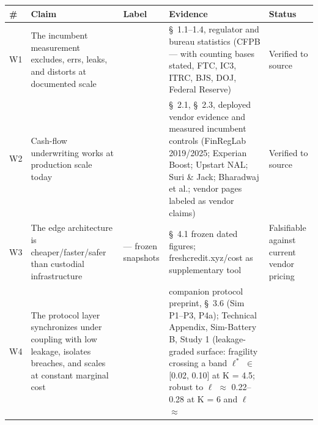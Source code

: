 \documentclass[
]{article}
\newcounter{none} %
\begin{document}
{\def\LTcaptype{none} %
\begin{longtable}[]{@{}
  >{\raggedright\arraybackslash}p{}
  >{\raggedright\arraybackslash}p{}
  >{\raggedright\arraybackslash}p{}
  >{\raggedright\arraybackslash}p{}
  >{\raggedright\arraybackslash}p{}@{}}
\toprule\noalign{}
\begin{minipage}[b]{\linewidth}\raggedright
\#
\end{minipage} & \begin{minipage}[b]{\linewidth}\raggedright
Claim
\end{minipage} & \begin{minipage}[b]{\linewidth}\raggedright
Label
\end{minipage} & \begin{minipage}[b]{\linewidth}\raggedright
Evidence
\end{minipage} & \begin{minipage}[b]{\linewidth}\raggedright
Status
\end{minipage} \\
\midrule\noalign{}
\endhead
\bottomrule\noalign{}
\endlastfoot
W1 & The incumbent measurement excludes, errs, leaks, and distorts at
documented scale & & §~1.1--1.4, regulator and bureau statistics (CFPB
--- with counting bases stated, FTC, IC3, ITRC, BJS, DOJ, Federal
Reserve) & Verified to source \\
W2 & Cash-flow underwriting works at production scale today & & §~2.1,
§~2.3, deployed vendor evidence and measured incumbent controls
(FinRegLab 2019/2025; Experian Boost; Upstart NAL; Suri \& Jack;
Bharadwaj et al.; vendor pages labeled as vendor claims) & Verified to
source \\
W3 & The edge architecture is cheaper/faster/safer than custodial
infrastructure & --- frozen snapshots & §~4.1 frozen dated figures;
freshcredit.xyz/cost as supplementary tool & Falsifiable against current
vendor pricing \\
W4 & The protocol layer synchronizes under coupling with low leakage,
isolates breaches, and scales at constant marginal cost & & companion
protocol preprint, §~3.6 (Sim P1--P3, P4a); Technical Appendix,
Sim-Battery B, Study 1 (leakage-graded surface: fragility crossing a
band \(\ell^{*}\) \(\in\) {[}0.02, 0.10{]} at K = 4.5; robust to
\(\ell\) \(\approx\) 0.22--0.28 at K = 6 and \(\ell\) \(\approx\)

\end{longtable}}
\end{document}
